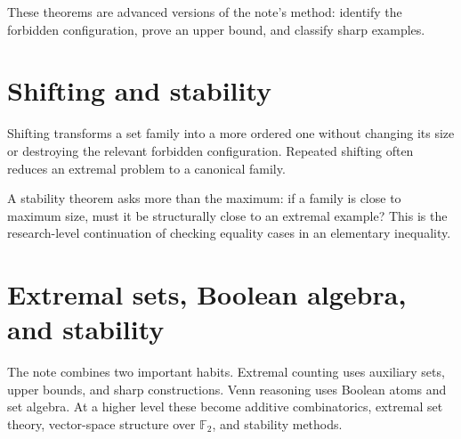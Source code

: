 These theorems are advanced versions of the note's method: identify the forbidden configuration, prove an upper bound, and classify sharp examples.

\section{Shifting and stability}

Shifting transforms a set family into a more ordered one without changing its size or destroying the relevant forbidden configuration.  Repeated shifting often reduces an extremal problem to a canonical family.

A stability theorem asks more than the maximum: if a family is close to maximum size, must it be structurally close to an extremal example?  This is the research-level continuation of checking equality cases in an elementary inequality.

\section{Extremal sets, Boolean algebra, and stability}

The note combines two important habits.  Extremal counting uses auxiliary sets, upper bounds, and sharp constructions.  Venn reasoning uses Boolean atoms and set algebra.  At a higher level these become additive combinatorics, extremal set theory, vector-space structure over \(\mathbb F_2\), and stability methods.
